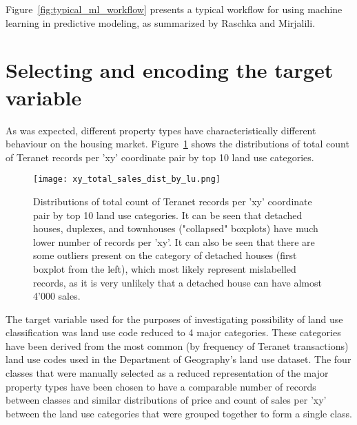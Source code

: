 Figure~\ref{fig:typical_ml_workflow} presents a typical workflow for using machine learning in predictive modeling, as summarized by Raschka and Mirjalili\cite{RaschkaMirjalili2017}.

\section{Selecting and encoding the target variable} \label{sec:select_encode_target}

As was expected, different property types have characteristically different behaviour on the housing market.
Figure~\ref{fig:xy_total_sales_dist_by_lu} shows the distributions of total count of Teranet records per 'xy' coordinate pair by top 10 land use categories.

\begin{figure}[hbt!]
    \centering
    \texttt{[image: xy\_total\_sales\_dist\_by\_lu.png]}
    \caption{Distributions of total count of Teranet records per 'xy' coordinate pair by top 10 land use categories.
    It can be seen that detached houses, duplexes, and townhouses ("collapsed" boxplots) have much lower number of records per 'xy'.
    It can also be seen that there are some outliers present on the category of detached houses (first boxplot from the left), which most likely represent mislabelled records, as it is very unlikely that a detached house can have almost 4'000 sales.}
    \label{fig:xy_total_sales_dist_by_lu}
\end{figure}

The target variable used for the purposes of investigating possibility of land use classification was land use code reduced to 4 major categories.
These categories have been derived from the most common (by frequency of Teranet transactions) land use codes used in the Department of Geography's land use dataset.
The four classes that were manually selected as a reduced representation of the major property types have been chosen to have a comparable number of records between classes and similar distributions of price and count of sales per 'xy' between the land use categories that were grouped together to form a single class.

